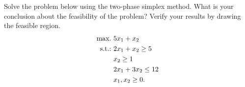 Solve the problem below using the two-phase simplex method. What is your conclusion about the feasibility of the problem? Verify your results by drawing the feasible region.
%
\begin{align*}
	\mathop{\text{max.~}} & 5x_1 + x_2 			\\
	\mathop{\text{s.t.:~}}   & 2x_1 + x_2 \geq 5   \\
		  & x_2 \geq 1 			\\
		  & 2x_1 + 3x_2 \leq 12 \\
		  & x_1, x_2 \geq 0.
\end{align*}
